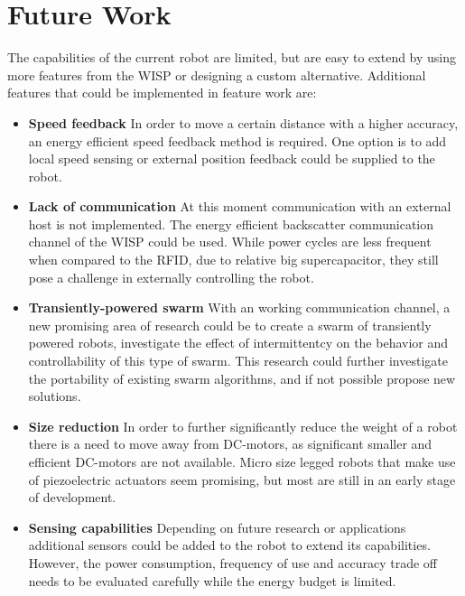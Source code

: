 \section{Future Work}
\label{sec:limitations_future_work}

The capabilities of the current robot are limited, but are easy to extend by using more features from the WISP or designing a custom alternative.
Additional features that could be implemented in feature work are:

\begin{itemize}

\item \textbf{Speed feedback} 
In order to move a certain distance with a higher accuracy, an energy efficient speed feedback method is required.
One option is to add local speed sensing or external position feedback could be supplied to the robot.


\item \textbf{Lack of communication}
At this moment communication with an external host is not implemented.
The energy efficient backscatter communication channel of the WISP could be used.
While power cycles are less frequent when compared to the RFID, due to relative big supercapacitor, they still pose a challenge in externally controlling the robot.

\item \textbf{Transiently-powered swarm}
With an working communication channel, a new promising area of research could be to create a swarm of transiently powered robots, investigate the effect of intermittentcy on the behavior and controllability of this type of swarm.
This research could further investigate the portability of existing swarm algorithms, and if not possible propose new solutions.	

\item \textbf{Size reduction} 
In order to further significantly reduce the weight of a robot there is a need to move away from DC-motors, as significant smaller and efficient DC-motors are not available.
Micro size legged robots that make use of piezoelectric actuators seem promising, but most are still in an early stage of development.

\item \textbf{Sensing capabilities}
Depending on future research or applications additional sensors could be added to the robot to extend its capabilities.
However, the power consumption, frequency of use and accuracy trade off needs to be evaluated carefully while the energy budget is limited.


\end{itemize}

